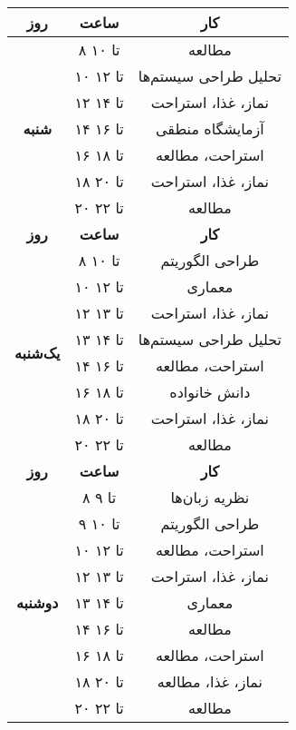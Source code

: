 \documentclass{article}
\begin{document}
	
	\begin{center}
		\begin{longtable}{|c|c|c|}
				\hline
				\textbf{روز} & \textbf{ساعت} & \textbf{کار} \\
				\hline
			
				\multirow{7}{*}{\textbf{شنبه}} 				
				& ۸ تا ۱۰ &   مطالعه \\
				\cline{2-3}				
				& ۱۰ تا ۱۲ & تحلیل طراحی سیستم‌ها \\
				\cline{2-3}				
				& ۱۲ تا ۱۴ & نماز، غذا، استراحت \\
				\cline{2-3}				
				& ۱۴ تا ۱۶ & آزمایشگاه منطقی \\
				\cline{2-3}				
				& ۱۶ تا ۱۸ & استراحت،   مطالعه \\
				\cline{2-3}				
				& ۱۸ تا ۲۰ & نماز، غذا، استراحت\\
				\cline{2-3}				
				& ۲۰ تا ۲۲ &   مطالعه \\
				\hline \hline	
			
				\textbf{روز} & \textbf{ساعت} & \textbf{کار} \\
				\hline
				
				\multirow{8}{*}{\textbf{یک‌شنبه}} 				
				& ۸ تا ۱۰ & طراحی الگوریتم \\
				\cline{2-3}				
				& ۱۰ تا ۱۲ & معماری \\
				\cline{2-3}				
				& ۱۲ تا ۱۳ & نماز، غذا، استراحت \\
				\cline{2-3}				
				& ۱۳ تا ۱۴ & تحلیل طراحی سیستم‌ها \\
				\cline{2-3}				
				& ۱۴ تا ۱۶ & استراحت،   مطالعه \\
				\cline{2-3}				
				& ۱۶ تا ۱۸ & دانش خانواده \\
				\cline{2-3}				
				& ۱۸ تا ۲۰ & نماز، غذا، استراحت \\
				\cline{2-3}				
				& ۲۰ تا ۲۲ &   مطالعه \\
				\hline 
			
				\newpage
				\hline
				\textbf{روز} & \textbf{ساعت} & \textbf{کار} \\
				\hline
			
			
				\multirow{9}{*}{\textbf{دوشنبه}} 				
			    & ۸ تا ۹ & نظریه زبان‌ها \\
				\cline{2-3}				
				& ۹ تا ۱۰ & طراحی الگوریتم \\
				\cline{2-3}				
				& ۱۰ تا ۱۲ & استراحت، مطالعه \\
				\cline{2-3}				
				& ۱۲ تا ۱۳ & نماز، غذا، استراحت \\
				\cline{2-3}				
				& ۱۳ تا ۱۴ & معماری \\
				\cline{2-3}				
				& ۱۴ تا ۱۶ & مطالعه \\
				\cline{2-3}				
				& ۱۶ تا ۱۸ & استراحت، مطالعه \\
				\cline{2-3}				
				& ۱۸ تا ۲۰ & نماز، غذا، مطالعه \\
				\cline{2-3}				
				& ۲۰ تا ۲۲ & مطالعه \\
				\hline	\hline
			

\end{longtable}
\end{center}
\end{document}
